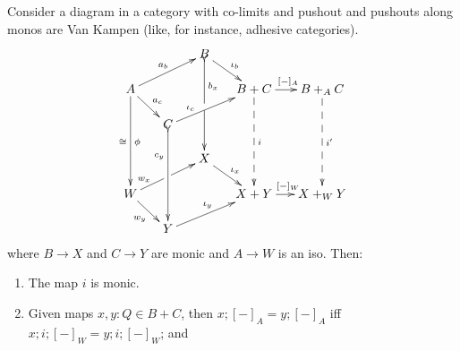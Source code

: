 \documentclass[12pt]{article}
\newcommand{\from}{\colon}
\renewcommand{\(}{\left(}
\renewcommand{\)}{\right)}
\renewcommand{\{}{\left\lbrace}
\renewcommand{\}}{\right\rbrace}
\theoremstyle{remark}
\theoremstyle{definition}
\begin{document}
 Consider a diagram in a category with co-limits and pushout and pushouts along monos are Van Kampen (like, for instance, adhesive categories).
 \begin{equation} \label{Diag:Lemma}
 \xymatrix@C=.2in@R=.2in{
 	{} &
 	{} &
 	{B}
 	\ar@{>->}[ddd]^(.3){b_x}|\hole
 	\ar[dr]^{\iota_b} &
 	{} &
 	{} \\
 	{A} 
 	\ar[ddd]_{\cong}^{\phi}
 	\ar[dr]^{a_c}
 	\ar[urr]^{a_b} &
 	{} &
 	{} &
 	{B+C} 
 	\ar@{-->}[ddd]^{i}
 	\ar[r]^{[-]_A} &
 	{B+_A C} 
 	\ar@{-->}[ddd]^{i'} \\
 	{} &
 	{C} 
 	\ar@{>->}[ddd]_(.3){c_y}
 	\ar[urr]^(.3){\iota_c} &
 	{} &
 	{} &
 	{} \\
 	{} &
 	{} &
 	{X} 
 	\ar[dr]^{\iota_x} &
 	{} &
 	{} \\
 	{W} 
 	\ar[dr]_{w_y}
 	\ar[urr]^(.25){w_x}|\hole &
 	{} &
 	{} &
 	{X+Y} 
 	\ar[r]^{[-]_W} &
 	{X+_WY} \\
 	{} &
 	{Y} 
 	\ar[urr]^{\iota_y} &
 	{} &
 	{} &
 	{} \\
 }
 \end{equation}
 where $B \to X$ and $C \to Y$ are monic and $A \to W$ is an iso. Then:
 \begin{enumerate}
 	\item The map $i$ is monic. \label{Lem:Claim1}
 	\item Given maps $x,y \from Q \in B+C$, then $x;[-]_A = y;[-]_A$ iff $x;i;[-]_W = y;i;[-]_W$; and \label{Lem:Claim2}
 \end{enumerate} 
 
\end{document}
